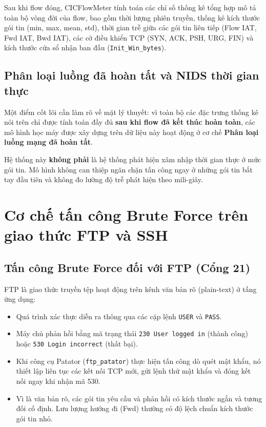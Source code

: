 Sau khi flow đóng, CICFlowMeter tính toán các chỉ số thống kê tổng hợp mô tả toàn bộ vòng đời của flow, bao gồm thời lượng phiên truyền, thống kê kích thước gói tin (min, max, mean, std), thời gian trễ giữa các gói tin liên tiếp (Flow IAT, Fwd IAT, Bwd IAT), các cờ điều khiển TCP (SYN, ACK, PSH, URG, FIN) và kích thước cửa sổ nhận ban đầu (\texttt{Init\_Win\_bytes}).

\subsection{Phân loại luồng đã hoàn tất và NIDS thời gian thực}
Một điểm cốt lõi cần làm rõ về mặt lý thuyết: vì toàn bộ các đặc trưng thống kê nói trên chỉ được tính toán đầy đủ \textbf{sau khi flow đã kết thúc hoàn toàn}, các mô hình học máy được xây dựng trên dữ liệu này hoạt động ở cơ chế \textbf{Phân loại luồng mạng đã hoàn tất}.

Hệ thống này \textbf{không phải} là hệ thống phát hiện xâm nhập thời gian thực ở mức gói tin. Mô hình không can thiệp ngăn chặn tấn công ngay ở những gói tin bắt tay đầu tiên và không đo lường độ trễ phát hiện theo mili-giây.

\section{Cơ chế tấn công Brute Force trên giao thức FTP và SSH}

\subsection{Tấn công Brute Force đối với FTP (Cổng 21)}
FTP là giao thức truyền tệp hoạt động trên kênh văn bản rõ (plain-text) ở tầng ứng dụng:
\begin{itemize}
    \item Quá trình xác thực diễn ra thông qua các cặp lệnh \texttt{USER} và \texttt{PASS}.
    \item Máy chủ phản hồi bằng mã trạng thái \texttt{230 User logged in} (thành công) hoặc \texttt{530 Login incorrect} (thất bại).
    \item Khi công cụ Patator (\texttt{ftp\_patator}) thực hiện tấn công dò quét mật khẩu, nó thiết lập liên tục các kết nối TCP mới, gửi lệnh thử mật khẩu và đóng kết nối ngay khi nhận mã 530.
    \item Vì là văn bản rõ, các gói tin yêu cầu và phản hồi có kích thước ngắn và tương đối cố định. Lưu lượng hướng đi (Fwd) thường có độ lệch chuẩn kích thước gói tin nhỏ.
\end{itemize}

